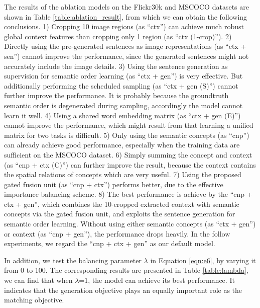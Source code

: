 \documentclass[10pt,twocolumn,letterpaper]{article}
\begin{document}
The results of the ablation models on the Flickr30k and MSCOCO datasets
are shown in Table \ref{table:ablation_result},
from which we can obtain the following conclusions.
1) Cropping 10 image regions (as ``ctx'') can achieve much robust global
context features than cropping only 1 region (as ``ctx (1-crop)'').
2) Directly using the pre-generated sentences as image representations
(as ``ctx + sen'') cannot improve the performance,
since the generated sentences might not accurately
include the image details.
3) Using the sentence generation as supervision
for semantic order learning (as ``ctx + gen'') is very effective.
But additionally performing the scheduled sampling (as ``ctx + gen (S)'') cannot
further improve the performance. It is probably because the groundtruth semantic order
is degenerated during sampling, accordingly the model cannot learn it well.
4) Using a shared word embedding matrix (as ``ctx + gen (E)'') cannot improve
the performance, which might result from that learning a unified
matrix for two tasks is difficult.
5) Only using the semantic concepts (as ``cnp'') can already achieve good performance,
especially when the training data are sufficient on the MSCOCO dataset.
6) Simply summing the concept and context (as ``cnp + ctx (C)'')
can further improve the result,
because the context contains the spatial relations of concepts which are very useful.
7) Using the proposed gated fusion unit (as ``cnp + ctx'') performs better, due to
the effective importance balancing scheme.
8) The best performance is achieve by the ``cnp + ctx + gen'',
which combines the 10-cropped extracted context
with semantic concepts via the gated fusion unit,
and exploits the sentence generation for semantic order learning.
Without using either semantic concepts (as ``ctx + gen'') or context (as ``cnp + gen''),
the performance drops heavily.
In the follow experiments, we regard the ``cnp + ctx + gen'' as our default model.

In addition, we test the balancing parameter $\lambda$
in Equation \ref {eqn:e6}, by varying it from 0 to 100.
The corresponding results are presented in Table \ref{table:lambda},
we can find that when $\lambda$=$1$, the model can achieve its best performance.
It indicates that the generation objective plays an equally important role as the
matching objective.
\end{document}
